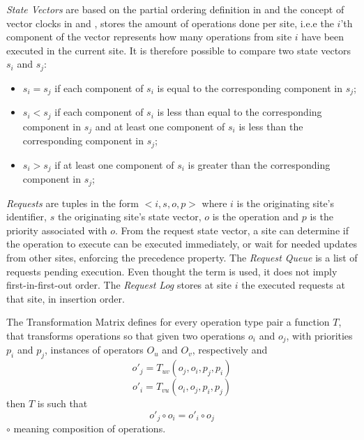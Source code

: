 \textit{State Vectors} are based on the partial ordering definition in \cite{Lamport1978} and the concept of vector clocks in \cite{Liskov1986} and \cite{Fidge1988}, stores the amount of operations done per site, i.e.e the $i$'th component of the vector represents how many operations from site $i$ have been executed in the current site. It is therefore possible to compare two state vectors $s_i$ and $s_j$:
\begin{itemize}
    \item $s_i = s_j$ if each component of $s_i$ is equal to the corresponding component in $s_j$;
    \item $s_i < s_j$ if each component of $s_i$ is less than equal to the corresponding component in $s_j$ and at least one component of $s_i$ is less than the corresponding component in $s_j$;
    \item $s_i > s_j$ if at least one component of $s_i$ is greater than the corresponding component in $s_j$;
\end{itemize}

\textit{Requests} are tuples in the form $<i,s,o,p>$ where $i$ is the originating site's identifier, $s$ the originating site's state vector, $o$ is the operation and $p$ is the priority associated with $o$.
From the request state vector, a site can determine if the operation to execute can be executed immediately, or wait for needed updates from other sites, enforcing the precedence property. The \textit{Request Queue} is a list of requests pending execution. Even thought the term  is used, it does not imply first-in-first-out order. The \textit{Request Log} stores at site $i$ the executed requests at that site, in insertion order.

The Transformation Matrix defines for every operation type pair a function $T$, that transforms operations so that given two operations $o_i$ and $o_j$, with priorities $p_i$ and $p_j$, instances of operators $O_u$ and $O_v$, respectively and
\begin{equation*}
    o'_j = T_{uv}(o_j, o_i, p_j, p_i)
\end{equation*}
\begin{equation*}
    o'_i = T_{vu}(o_i, o_j, p_i, p_j)
\end{equation*}
then $T$ is such that
\begin{equation*}
    o'_j \circ o_i = o'_i \circ o_j
\end{equation*}
$\circ$ meaning composition of operations.

